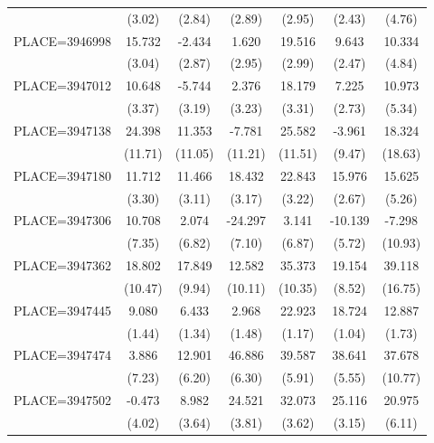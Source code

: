 {\begin{tabular}{l*{6}{c}}
                    &      (3.02)&      (2.84)&      (2.89)&      (2.95)&      (2.43)&      (4.76)\\
PLACE=3946998       &      15.732&      -2.434&       1.620&      19.516&       9.643&      10.334\\
                    &      (3.04)&      (2.87)&      (2.95)&      (2.99)&      (2.47)&      (4.84)\\
PLACE=3947012       &      10.648&      -5.744&       2.376&      18.179&       7.225&      10.973\\
                    &      (3.37)&      (3.19)&      (3.23)&      (3.31)&      (2.73)&      (5.34)\\
PLACE=3947138       &      24.398&      11.353&      -7.781&      25.582&      -3.961&      18.324\\
                    &     (11.71)&     (11.05)&     (11.21)&     (11.51)&      (9.47)&     (18.63)\\
PLACE=3947180       &      11.712&      11.466&      18.432&      22.843&      15.976&      15.625\\
                    &      (3.30)&      (3.11)&      (3.17)&      (3.22)&      (2.67)&      (5.26)\\
PLACE=3947306       &      10.708&       2.074&     -24.297&       3.141&     -10.139&      -7.298\\
                    &      (7.35)&      (6.82)&      (7.10)&      (6.87)&      (5.72)&     (10.93)\\
PLACE=3947362       &      18.802&      17.849&      12.582&      35.373&      19.154&      39.118\\
                    &     (10.47)&      (9.94)&     (10.11)&     (10.35)&      (8.52)&     (16.75)\\
PLACE=3947445       &       9.080&       6.433&       2.968&      22.923&      18.724&      12.887\\
                    &      (1.44)&      (1.34)&      (1.48)&      (1.17)&      (1.04)&      (1.73)\\
PLACE=3947474       &       3.886&      12.901&      46.886&      39.587&      38.641&      37.678\\
                    &      (7.23)&      (6.20)&      (6.30)&      (5.91)&      (5.55)&     (10.77)\\
PLACE=3947502       &      -0.473&       8.982&      24.521&      32.073&      25.116&      20.975\\
                    &      (4.02)&      (3.64)&      (3.81)&      (3.62)&      (3.15)&      (6.11)\\

\end{tabular}}
